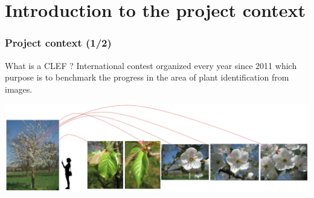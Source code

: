 \documentclass[xcolor=table]{beamer}
\begin{document}
\section{Introduction to the project context}
\begin{frame} \frametitle{Project context (1/2)}

\begin{block}{What is a CLEF ?}
	International contest organized every year since 2011 which purpose is to benchmark the progress in the area of plant identification from images.
\end{block}

	\includegraphics[scale=0.27]{OnePrunus.png}



\end{frame}
\end{document}
